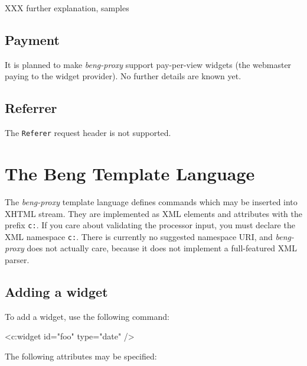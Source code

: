 \documentclass[a4paper,12pt]{article}
\begin{document}
XXX further explanation, samples


\subsection{Payment}

It is planned to make \emph{beng-proxy} support pay-per-view widgets
(the webmaster paying to the widget provider).  No further details are
known yet.


\subsection{Referrer}

The \texttt{Referer} request header is not supported.


\section{The Beng Template Language}
\label{processor}

The \emph{beng-proxy} template language defines commands which may be
inserted into XHTML stream.  They are implemented as XML elements and
attributes with the prefix \texttt{c:}.  If you care about validating
the processor input, you must declare the XML namespace \texttt{c:}.
There is currently no suggested namespace URI, and \emph{beng-proxy}
does not actually care, because it does not implement a full-featured
XML parser.

\subsection{Adding a widget}

To add a widget, use the following command:

\begin{verbatim*}
<c:widget id="foo" type="date" />
\end{verbatim*}

The following attributes may be specified:
\end{document}
